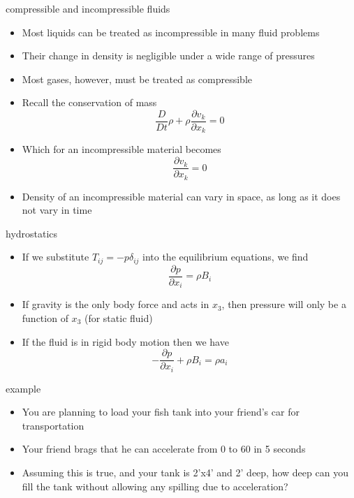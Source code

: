 \documentclass[12pt,handout]{beamer}
\providecommand{\tightlist}{%
  \setlength{\itemsep}{0pt}\setlength{\parskip}{0pt}}
\providecommand{\tightlist}{%
\setlength{\itemsep}{0pt}\setlength{\parskip}{0pt}}
\begin{document}
\begin{frame}{compressible and incompressible fluids}
\protect\hypertarget{compressible-and-incompressible-fluids}{}
\begin{itemize}
\item
  Most liquids can be treated as incompressible in many fluid problems
\item
  Their change in density is negligible under a wide range of pressures
\item
  Most gases, however, must be treated as compressible
\item
  Recall the conservation of mass
  \[\frac{D}{Dt} \rho + \rho \frac{\partial v_k}{\partial x_k} = 0\]
\item
  Which for an incompressible material becomes
  \[\frac{\partial v_k}{\partial x_k} = 0\]
\item
  Density of an incompressible material can vary in space, as long as it
  does not vary in time
\end{itemize}
\end{frame}

\begin{frame}{hydrostatics}
\protect\hypertarget{hydrostatics}{}
\begin{itemize}
\item
  If we substitute \(T_{ij} = -p \delta_{ij}\) into the equilibrium
  equations, we find \[\frac{\partial p}{\partial x_i} = \rho B_i\]
\item
  If gravity is the only body force and acts in \(x_3\), then pressure
  will only be a function of \(x_3\) (for static fluid)
\item
  If the fluid is in rigid body motion then we have
  \[-\frac{\partial p}{\partial x_i} + \rho B_i = \rho a_i\]
\end{itemize}
\end{frame}

\begin{frame}{example}
\protect\hypertarget{example}{}
\begin{itemize}
\tightlist
\item
  You are planning to load your fish tank into your friend's car for
  transportation
\item
  Your friend brags that he can accelerate from 0 to 60 in 5 seconds
\item
  Assuming this is true, and your tank is 2'x4' and 2' deep, how deep
  can you fill the tank without allowing any spilling due to
  acceleration?
\end{itemize}
\end{frame}
\end{document}
